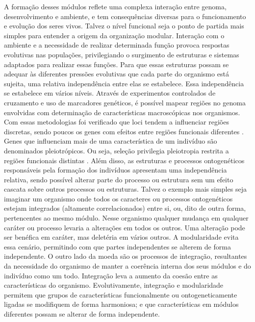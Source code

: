 A formação desses módulos reflete uma complexa interação entre genoma,
desenvolvimento e ambiente, e tem consequências diversas para o
funcionamento e evolução dos seres vivos.
Talvez o nível funcional seja o ponto de partida mais simples para
entender a origem da organização modular.
Interação com o ambiente e a necessidade de realizar determinada função
provoca respostas evolutivas nas populações, privilegiando o surgimento
de estruturas e sistemas adaptados para realizar essas funções.
Para que essas estruturas possam se adequar às diferentes pressões
evolutivas que cada parte do organismo está sujeita, uma relativa
independência entre elas se estabelece.
Essa independência se estabelece em vários níveis.
Através de experimentos controlados de cruzamento e uso de marcadores
genéticos, é possível mapear regiões no genoma envolvidas com
determinação de características macroscópicas nos organismos.
Com essas metodologias foi verificado que loci tendem a influenciar
regiões discretas, sendo poucos os genes com efeitos entre regiões
funcionais diferentes \citep{Cheverud1997}.
Genes que influenciam mais de uma característica de um indivíduo são
denominados pleiotrópicos.
Ou seja, seleção privilegia pleiotropia restrita a regiões funcionais
distintas \citep{Cheverud1984}.
Além disso, as estruturas e processos ontogenéticos responsáveis pela
formação dos indivíduos apresentam uma independência relativa, sendo
possível alterar parte do processo ou estrutura sem um efeito cascata
sobre outros processos ou estruturas.
Talvez o exemplo mais simples seja imaginar um organismo onde todos os
caracteres ou processos ontogenéticos estejam integrados (altamente
correlacionados) entre si, ou, dito de outra forma, pertencentes ao mesmo módulo.
Nesse organismo qualquer mudança em qualquer caráter ou processo levaria
a alterações em todos os outros.
Uma alteração pode ser benéfica em caráter, mas deletéria em vários
outros.
A modularidade evita essa cenário, permitindo com que partes
independentes se alterem de forma independente.
O outro lado da moeda são os processos de integração, resultantes da
necessidade do organismo de manter a coerência interna dos seus módulos
e do indivíduo como um todo.
Integração leva a aumento da coesão entre as características
do organismo.
Evolutivamente, integração e modularidade permitem que grupos de
características funcionalmente ou ontogeneticamente ligadas se
modifiquem de forma harmoniosa; e que características em módulos
diferentes possam se alterar de forma independente.

